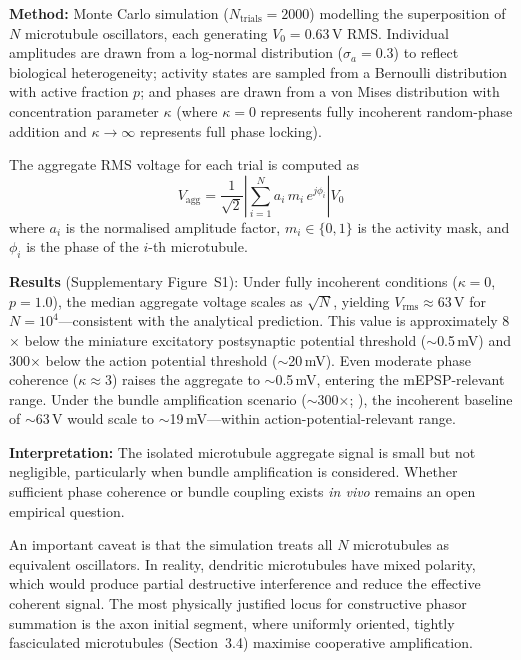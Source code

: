 \documentclass[10pt, a4paper, twocolumn]{article}
\begin{document}
\textbf{Method:} Monte Carlo simulation ($N_{\text{trials}} = 2000$)
modelling the superposition of $N$ microtubule oscillators, each
generating $V_0 = 0.63$\,\textmu V RMS. Individual amplitudes are
drawn from a log-normal distribution ($\sigma_a = 0.3$) to reflect
biological heterogeneity; activity states are sampled from a Bernoulli
distribution with active fraction $p$; and phases are drawn from a
von Mises distribution with concentration parameter $\kappa$
(where $\kappa = 0$ represents fully incoherent random-phase addition
and $\kappa \to \infty$ represents full phase locking).

The aggregate RMS voltage for each trial is computed as
\begin{equation}
V_{\text{agg}} = \frac{1}{\sqrt{2}}\left|\sum_{i=1}^{N} a_i \, m_i \,
e^{j\phi_i}\right| V_0
\label{eq:vagg}
\end{equation}
where $a_i$ is the normalised amplitude factor, $m_i \in \{0,1\}$ is
the activity mask, and $\phi_i$ is the phase of the $i$-th
microtubule.

\textbf{Results} (Supplementary Figure~S1): Under fully incoherent
conditions ($\kappa = 0$, $p = 1.0$), the median aggregate voltage
scales as $\sqrt{N}$, yielding $V_{\text{rms}} \approx 63$\,\textmu V
for $N = 10^4$---consistent with the analytical prediction. This value
is approximately 8$\times$ below the miniature excitatory postsynaptic
potential threshold ($\sim$0.5\,mV) and 300$\times$ below the action
potential threshold ($\sim$20\,mV). Even moderate phase coherence
($\kappa \approx 3$) raises the aggregate to $\sim$0.5\,mV, entering
the mEPSP-relevant range. Under the bundle amplification scenario
($\sim$300$\times$; \cite{cantero2018}), the incoherent baseline
of $\sim$63\,\textmu V would scale to $\sim$19\,mV---within
action-potential-relevant range.

\textbf{Interpretation:} The isolated microtubule aggregate signal is
small but not negligible, particularly when bundle amplification is
considered. Whether sufficient phase coherence or bundle coupling
exists \emph{in vivo} remains an open empirical question.

An important caveat is that the simulation treats all $N$
microtubules as equivalent oscillators. In reality, dendritic
microtubules have mixed polarity, which would produce partial
destructive interference and reduce the effective coherent
signal. The most physically justified locus for constructive
phasor summation is the axon initial segment, where
uniformly oriented, tightly fasciculated microtubules
(Section~3.4) maximise cooperative amplification.
\end{document}
